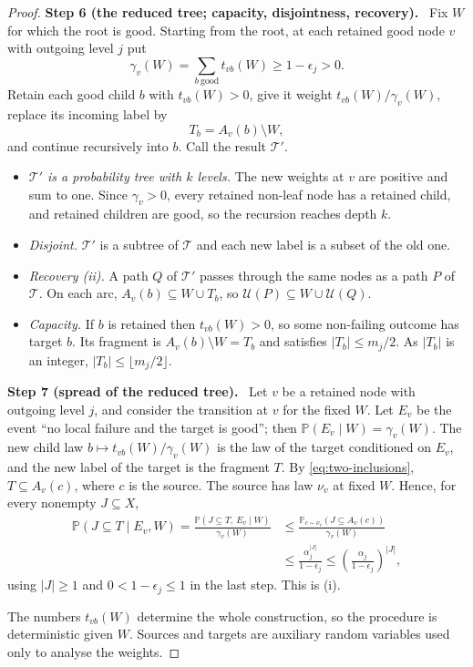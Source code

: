 \documentclass[11pt]{article}
\numberwithin{equation}{section}
\theoremstyle{remark}
\newcommand{\PP}{\mathbb P}
\newcommand{\TT}{\mathcal T}
\newcommand{\UU}{\mathcal U}
\newcommand{\step}[1]{\par\medskip\noindent\textbf{#1}\ }
\begin{document}
\begin{proof}
\step{Step 6 (the reduced tree; capacity, disjointness, recovery).} Fix
$W$ for which the root is good. Starting from the root, at each retained
good node $v$ with outgoing level $j$ put
\[
 \gamma_v(W)=\sum_{b\ \mathrm{good}}t_{vb}(W)\ge1-\epsilon_j>0 .
\]
Retain each good child $b$ with $t_{vb}(W)>0$, give it weight
$t_{vb}(W)/\gamma_v(W)$, replace its incoming label by
\[
 T_b=A_v(b)\setminus W,
\]
and continue recursively into $b$. Call the result $\TT'$.
\begin{itemize}[leftmargin=2em,itemsep=2pt]
 \item \emph{$\TT'$ is a probability tree with $k$ levels.} The new
 weights at $v$ are positive and sum to one. Since $\gamma_v>0$, every
 retained non-leaf node has a retained child, and retained children are
 good, so the recursion reaches depth $k$.
 \item \emph{Disjoint.} $\TT'$ is a subtree of $\TT$ and each new label
 is a subset of the old one.
 \item \emph{Recovery (ii).} A path $Q$ of $\TT'$ passes through the
 same nodes as a path $P$ of $\TT$. On each arc,
 $A_v(b)\subseteq W\cup T_b$, so $\UU(P)\subseteq W\cup\UU(Q)$.
 \item \emph{Capacity.} If $b$ is retained then $t_{vb}(W)>0$, so some
 non-failing outcome has target $b$. Its fragment is
 $A_v(b)\setminus W=T_b$ and satisfies $|T_b|\le m_j/2$. As $|T_b|$ is
 an integer, $|T_b|\le\lfloor m_j/2\rfloor$.
\end{itemize}

\step{Step 7 (spread of the reduced tree).} Let $v$ be a retained node
with outgoing level $j$, and consider the transition at $v$ for the
fixed $W$. Let $E_v$ be the event ``no local failure and the target is
good''; then $\PP(E_v\mid W)=\gamma_v(W)$. The new child law
$b\mapsto t_{vb}(W)/\gamma_v(W)$ is the law of the target conditioned on
$E_v$, and the new label of the target is the fragment $T$. By
\eqref{eq:two-inclusions}, $T\subseteq A_v(c)$, where $c$ is the source.
The source has law $\nu_v$ at fixed $W$. Hence, for every nonempty
$J\subseteq X$,
\begin{align*}
 \PP(J\subseteq T\mid E_v,W)
 =\frac{\PP(J\subseteq T,\ E_v\mid W)}{\gamma_v(W)}
 &\le\frac{\PP_{c\sim\nu_v}(J\subseteq A_v(c))}{\gamma_v(W)}\\
 &\le\frac{\alpha_j^{|J|}}{1-\epsilon_j}
 \le\left(\frac{\alpha_j}{1-\epsilon_j}\right)^{|J|},
\end{align*}
using $|J|\ge1$ and $0<1-\epsilon_j\le1$ in the last step. This is (i).

\medskip
The numbers $t_{vb}(W)$ determine the whole construction, so the
procedure is deterministic given $W$. Sources and targets are auxiliary
random variables used only to analyse the weights.
\end{proof}
\end{document}
